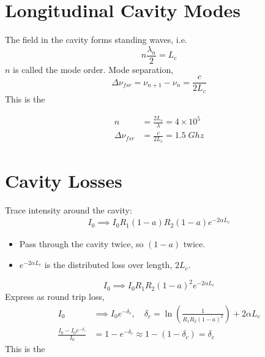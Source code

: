 \documentclass[a4paper, 11pt, normalem]{report}
\begin{document}
\section{Longitudinal Cavity Modes}
The field in the cavity forms standing waves, i.e.
\begin{equation}
    n\frac{\lambda_n}{2} = L_c
\end{equation}
$n$ is called the mode order.
Mode separation,
\begin{equation}
    \Delta\nu_{fsr} = \nu_{n+1} - \nu_n = \frac{c}{2L_c}
\end{equation}
This is the 
\begin{example}[Mode order of 10cm cavity at $\lambda= 500\,nm$]
\begin{figure}
    \centering
\end{figure}
\begin{align}
    n &= \frac{2L_c}{\lambda} = 4\times10^5 \\
    \Delta\nu_{fsr} &= \frac{c}{2L_c} = 1.5\;Ghz
\end{align}
\end{example}

\section{Cavity Losses}
Trace intensity around the cavity:
\begin{align}
    I_0 \implies I_0R_1(1-a)R_2(1-a)e^{-2\alpha L_c}
\end{align}
\begin{itemize}
    \item Pass through the cavity twice, so $(1-a)$ twice.
    \item $e^{-2\alpha L_c}$ is the distributed loss over length, $2L_c$.
\end{itemize}
\begin{equation}
    I_0 \implies I_0R_1R_2(1-a)^2e^{-2\alpha L_c}
\end{equation}
Express as round trip loss,
\begin{align}
    I_0 &\implies I_0e^{-\delta_c},\quad \delta_c = \ln\left(\frac{1}{R_1R_2(1-a)^2}\right)+2\alpha L_c \\
    \frac{I_0-I_0e^{-\delta_c}}{I_0} &= 1 - e^{-\delta_c} \approx 1-(1-\delta_c) = \delta_c
\end{align}
This is the 
\end{document}
